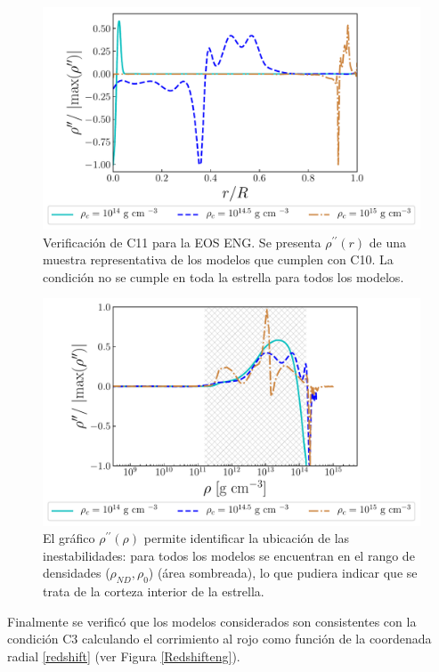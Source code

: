 \begin{figure}[H]
    \centering
    \includegraphics[width=0.93\linewidth]{figures/ConvecStabilityeng.pdf}
    \caption[Verificación de C11 para la EOS ENG]{Verificación de C11 para la EOS ENG. Se presenta $\rho^{\prime\prime}(r)$ de una muestra representativa de los modelos que cumplen con C10. La condición no se cumple en toda la estrella para todos los modelos. }
    \label{ConvecStabilityeng}
\end{figure}
\begin{figure}[H]
    \centering
    \includegraphics[width=0.93\linewidth]{figures/ConvecStabilityengCorrel.pdf}
    \caption[Correlación entre la inestabilidad y la corteza interior usando el diagrama $\rho^{\prime\prime}$ vs $\rho$]{El gráfico $\rho^{\prime\prime}(\rho)$ permite identificar la ubicación de las inestabilidades: para todos los modelos se encuentran en el rango de densidades ($\rho_{ND},\rho_0$) (área sombreada), lo que pudiera indicar que se trata de la corteza interior de la estrella.} 
    \label{ConvecStabilityengCorrel}
\end{figure}

Finalmente se verificó que los modelos considerados son consistentes con la condición C3 calculando el corrimiento al rojo como función de la coordenada radial \eqref{redshift} (ver Figura \ref{Redshifteng}). 

